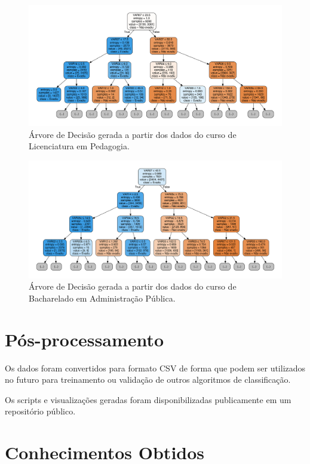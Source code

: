 \begin{figure}[!htb]
  \centering
  \caption{\label{treePed} Árvore de Decisão gerada a partir dos dados do curso de Licenciatura em Pedagogia.}
  \includegraphics[angle=-90,scale=.50]{img/ped_tree}
  \Ididthis
\end{figure}

\begin{figure}[!htb]
  \centering
  \caption{\label{treeAdm} Árvore de Decisão gerada a partir dos dados do curso de Bacharelado em Administração Pública.}
  \includegraphics[angle=-90,scale=.50]{img/adm_tree}
  \Ididthis
\end{figure}

\section{Pós-processamento}

Os dados foram convertidos para formato CSV de forma que podem ser utilizados no
futuro para treinamento ou validação de outros algoritmos de classificação.

Os  scripts e visualizações geradas foram disponibilizadas publicamente em um
repositório público.

\section{Conhecimentos Obtidos}


